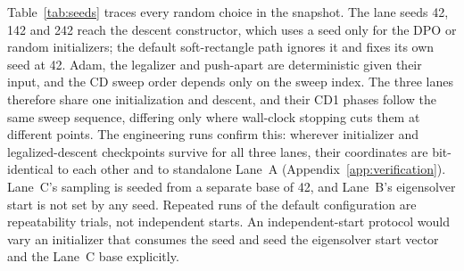 Table~\ref{tab:seeds} traces every random choice in the snapshot. The lane seeds
42, 142 and 242 reach the descent constructor, which uses a seed only for the DPO
or random initializers; the default soft-rectangle path ignores it and fixes its own
seed at 42. Adam, the legalizer and push-apart are deterministic given their input,
and the CD sweep order depends only on the sweep index. The three lanes therefore
share one initialization and descent, and their CD1 phases follow the same sweep
sequence, differing only where wall-clock stopping cuts them at different points. The engineering runs confirm
this: wherever initializer and legalized-descent checkpoints survive for all three
lanes, their coordinates are bit-identical to each other and to standalone Lane~A
(Appendix~\ref{app:verification}). Lane~C's sampling is seeded from a separate base
of 42, and Lane~B's eigensolver start is not set by any seed. Repeated runs of the
default configuration are repeatability trials, not independent starts. An
independent-start protocol would vary an initializer that consumes the seed and
seed the eigensolver start vector and the Lane~C base explicitly.

